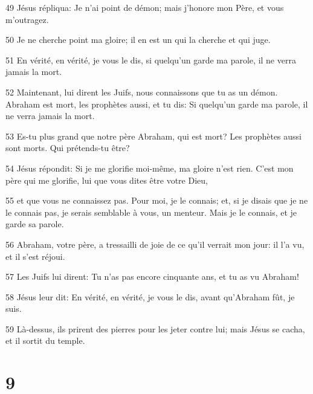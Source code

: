 \par 49 Jésus répliqua: Je n'ai point de démon; mais j'honore mon Père, et vous m'outragez.
\par 50 Je ne cherche point ma gloire; il en est un qui la cherche et qui juge.
\par 51 En vérité, en vérité, je vous le dis, si quelqu'un garde ma parole, il ne verra jamais la mort.
\par 52 Maintenant, lui dirent les Juifs, nous connaissons que tu as un démon. Abraham est mort, les prophètes aussi, et tu dis: Si quelqu'un garde ma parole, il ne verra jamais la mort.
\par 53 Es-tu plus grand que notre père Abraham, qui est mort? Les prophètes aussi sont morts. Qui prétends-tu être?
\par 54 Jésus répondit: Si je me glorifie moi-même, ma gloire n'est rien. C'est mon père qui me glorifie, lui que vous dites être votre Dieu,
\par 55 et que vous ne connaissez pas. Pour moi, je le connais; et, si je disais que je ne le connais pas, je serais semblable à vous, un menteur. Mais je le connais, et je garde sa parole.
\par 56 Abraham, votre père, a tressailli de joie de ce qu'il verrait mon jour: il l'a vu, et il s'est réjoui.
\par 57 Les Juifs lui dirent: Tu n'as pas encore cinquante ans, et tu as vu Abraham!
\par 58 Jésus leur dit: En vérité, en vérité, je vous le dis, avant qu'Abraham fût, je suis.
\par 59 Là-dessus, ils prirent des pierres pour les jeter contre lui; mais Jésus se cacha, et il sortit du temple.

\chapter{9}

